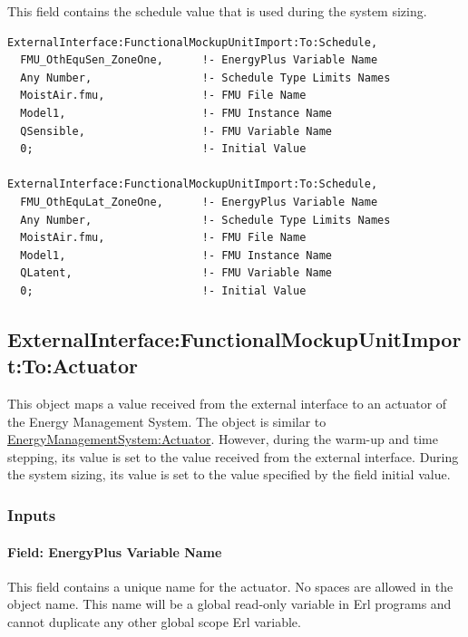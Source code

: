 This field contains the schedule value that is used during the system sizing.

\begin{lstlisting}
ExternalInterface:FunctionalMockupUnitImport:To:Schedule,
  FMU_OthEquSen_ZoneOne,      !- EnergyPlus Variable Name
  Any Number,                 !- Schedule Type Limits Names
  MoistAir.fmu,               !- FMU File Name
  Model1,                     !- FMU Instance Name
  QSensible,                  !- FMU Variable Name
  0;                          !- Initial Value

ExternalInterface:FunctionalMockupUnitImport:To:Schedule,
  FMU_OthEquLat_ZoneOne,      !- EnergyPlus Variable Name
  Any Number,                 !- Schedule Type Limits Names
  MoistAir.fmu,               !- FMU File Name
  Model1,                     !- FMU Instance Name
  QLatent,                    !- FMU Variable Name
  0;                          !- Initial Value
\end{lstlisting}

\subsection{ExternalInterface:FunctionalMockupUnitImport:To:Actuator}\label{externalinterfacefunctionalmockupunitimporttoactuator}

This object maps a value received from the external interface to an actuator of the Energy Management System. The object is similar to \hyperref[energymanagementsystemactuator]{EnergyManagementSystem:Actuator}. However, during the warm-up and time stepping, its value is set to the value received from the external interface. During the system sizing, its value is set to the value specified by the field initial value.

\subsubsection{Inputs}\label{inputs-7-009}

\paragraph{Field: EnergyPlus Variable Name}\label{field-energyplus-variable-name-2}

This field contains a unique name for the actuator. No spaces are allowed in the object name. This name will be a global read-only variable in Erl programs and cannot duplicate any other global scope Erl variable.

